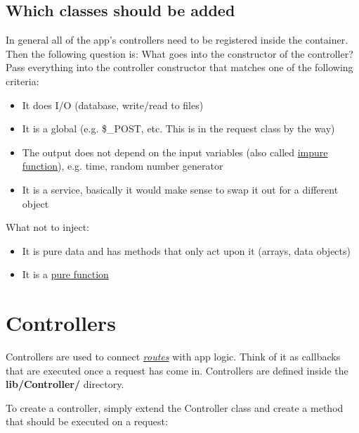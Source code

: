 \documentclass[letterpaper,10pt,english]{sphinxmanual}
\begin{document}
\subsection{Which classes should be added}
\label{app/container:which-classes-should-be-added}
In general all of the app's controllers need to be registered inside the container. Then the following question is: What goes into the constructor of the controller? Pass everything into the controller constructor that matches one of the following criteria:
\begin{itemize}
\item {} 
It does I/O (database, write/read to files)

\item {} 
It is a global (e.g. \$\_POST, etc. This is in the request class by the way)

\item {} 
The output does not depend on the input variables (also called \href{http://en.wikipedia.org/wiki/Pure\_function}{impure function}), e.g. time, random number generator

\item {} 
It is a service, basically it would make sense to swap it out for a different object

\end{itemize}

What not to inject:
\begin{itemize}
\item {} 
It is pure data and has methods that only act upon it (arrays, data objects)

\item {} 
It is a \href{http://en.wikipedia.org/wiki/Pure\_function}{pure function}

\end{itemize}


\section{Controllers}
\label{app/controllers:controllers}\label{app/controllers::doc}
Controllers are used to connect {\hyperref[app/routes::doc]{\emph{\emph{routes}}}} with app logic. Think of it as callbacks that are executed once a request has come in. Controllers are defined inside the \textbf{lib/Controller/} directory.

To create a controller, simply extend the Controller class and create a method that should be executed on a request:
\end{document}
